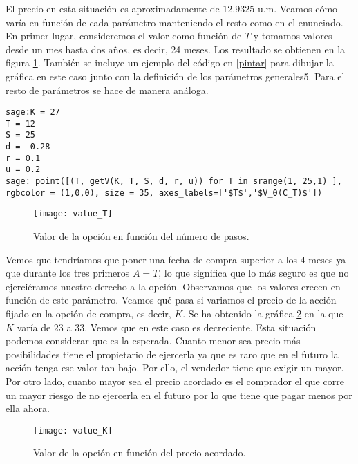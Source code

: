 El precio en esta situación es aproximadamente de $  12.9325 $ u.m. Veamos cómo varía en función de cada parámetro manteniendo el resto como en el enunciado. En primer lugar, consideremos el valor como función de $ T $ y tomamos valores desde un mes hasta dos años, es decir, 24 meses. Los resultado se obtienen en la figura \ref{valueT}. También se incluye un ejemplo del código en \ref{pintar} para dibujar la gráfica en este caso junto con la definición de los parámetros generales5. Para el resto de parámetros se hace de manera análoga. 

\begin{lstlisting}[label={pintar}, caption={Código en Sage para dibujar una gráfica}, morekeywords={sage}]
sage:K = 27
T = 12
S = 25
d = -0.28
r = 0.1
u = 0.2
sage: point([(T, getV(K, T, S, d, r, u)) for T in srange(1, 25,1) ], rgbcolor = (1,0,0), size = 35, axes_labels=['$T$','$V_0(C_T)$'])          	 
\end{lstlisting}

\begin{figure}[h!]
	\centering
	\texttt{[image: value\_T]}
	\caption{Valor de la opción en función del número de pasos.}
	\label{valueT}
\end{figure}

Vemos que tendríamos que poner una fecha de compra superior a los 4 meses ya que durante los tres primeros $ A = T $, lo que significa que lo más seguro es que no ejerciéramos nuestro derecho a la opción. Observamos que los valores crecen en función de este parámetro. Veamos qué pasa si variamos el precio de la acción fijado en la opción de compra, es decir, $ K $. Se ha obtenido la gráfica \ref{valueK} en la que $ K $ varía de 23 a 33. Vemos que en este caso es decreciente. Esta situación podemos considerar que es la esperada. Cuanto menor sea precio más posibilidades tiene el propietario de ejercerla ya que es raro que en el futuro la acción tenga ese valor tan bajo. Por ello, el vendedor tiene que exigir un mayor. Por otro lado, cuanto mayor sea el precio acordado es el comprador el que corre un mayor riesgo de no ejercerla en el futuro por lo que tiene que pagar menos por ella ahora. 

\begin{figure}[h!]
	\centering
	\texttt{[image: value\_K]}
	\caption{Valor de la opción en función del precio acordado.}
	\label{valueK}
\end{figure} 

